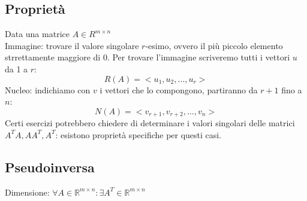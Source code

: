 \documentclass[10pt]{article}
\begin{document}
\subsection{Proprietà}
Data una matrice $A\in R^{m\times n}$\\
Immagine: trovare il valore singolare $r$-esimo, ovvero il più piccolo elemento strrettamente maggiore di 0. Per trovare l'immagine scriveremo tutti i vettori $u$ da 1 a $r$: \begin{equation*}
    R(A) = <u_{1}, u_{2}, \ldots, u_{r}>
\end{equation*}
Nucleo: indichiamo con $v$ i vettori che lo compongono, partiranno da $r+1$ fino a $n$:
\begin{equation*}
    N(A)=<v_{r+1}, v_{r+2}, \ldots, v_{n}>
\end{equation*}
Certi esercizi potrebbero chiedere di determinare i valori singolari delle matrici $A^{T}A, AA^{T}, A^{T}$: esistono proprietà specifiche per questi casi.
\subsection{Pseudoinversa}
Dimensione: $\forall A \in \mathbb{R}^{m\times n}: \exists A^{T}\in \mathbb{R}^{m\times n}$
\end{document}
